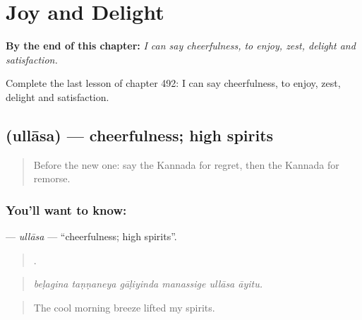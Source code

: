 
\chapter{Joy and Delight}
\label{ch:ka-joy-and-delight}

\begin{chapteropening}
\textbf{By the end of this chapter:} \emph{I can say cheerfulness, to enjoy, zest, delight and satisfaction.}

Complete the last lesson of chapter 492: I can say cheerfulness, to enjoy, zest, delight and satisfaction.
\end{chapteropening}

\section[\texorpdfstring{\kn{ಉಲ್ಲಾಸ} (ullāsa)}{ಉಲ್ಲಾಸ (ullāsa)}]{ (ullāsa) — cheerfulness; high spirits}

\label{lesson:KA-C492-ullasa}



\begin{quote}
Before the new one: say the Kannada for regret, then the Kannada for remorse.
\end{quote}

\subsection*{You'll want to know: }
\textbf{} — \emph{ullāsa} — \textquotedblleft{}cheerfulness; high spirits\textquotedblright{}.

\begin{quote}
     .
\end{quote}

\begin{quote}
\emph{beḷagina taṇṇaneya gāḷiyinda manassige ullāsa āyitu.}
\end{quote}

\begin{quote}
The cool morning breeze lifted my spirits.
\end{quote}

